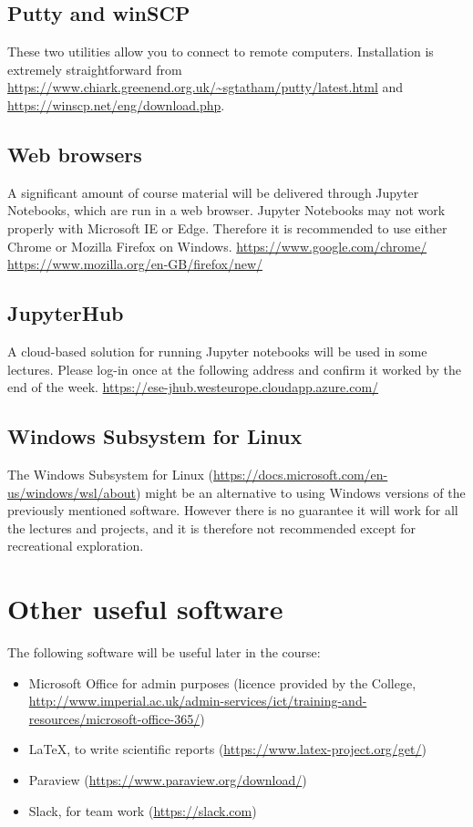 \documentclass[11pt]{article}
\begin{document}
\subsection{Putty and winSCP}

These two utilities allow you to connect to remote computers. 
Installation is extremely straightforward from 
\url{https://www.chiark.greenend.org.uk/~sgtatham/putty/latest.html} 
and \url{https://winscp.net/eng/download.php}.

\subsection{Web browsers}

A significant amount of course material will be delivered through Jupyter Notebooks, which are run in a web browser. 
Jupyter Notebooks may not work properly with Microsoft IE or Edge. 
Therefore it is recommended to use either Chrome or Mozilla Firefox on Windows.  
\url{https://www.google.com/chrome/}
\url{https://www.mozilla.org/en-GB/firefox/new/} 

\subsection{JupyterHub}

A cloud-based solution for running Jupyter notebooks will be used in some lectures. Please log-in once at the following address and confirm it worked by the end of the week.
\url{https://ese-jhub.westeurope.cloudapp.azure.com/}


\subsection{Windows Subsystem for Linux}

The Windows Subsystem for Linux (\url{https://docs.microsoft.com/en-us/windows/wsl/about}) might be an alternative to using Windows versions of the previously mentioned software. 
However there is no guarantee it will work for all the lectures and projects, and it is therefore not recommended except for recreational exploration.


\section{Other useful software}

The following software will be useful later in the course:
\begin{itemize}
  \item Microsoft Office for admin purposes (licence provided by the College, \url{http://www.imperial.ac.uk/admin-services/ict/training-and-resources/microsoft-office-365/})
  \item LaTeX, to write scientific reports (\url{https://www.latex-project.org/get/})
  \item Paraview (\url{https://www.paraview.org/download/})
  \item Slack, for team work (\url{https://slack.com})
\end{itemize}
\end{document}
